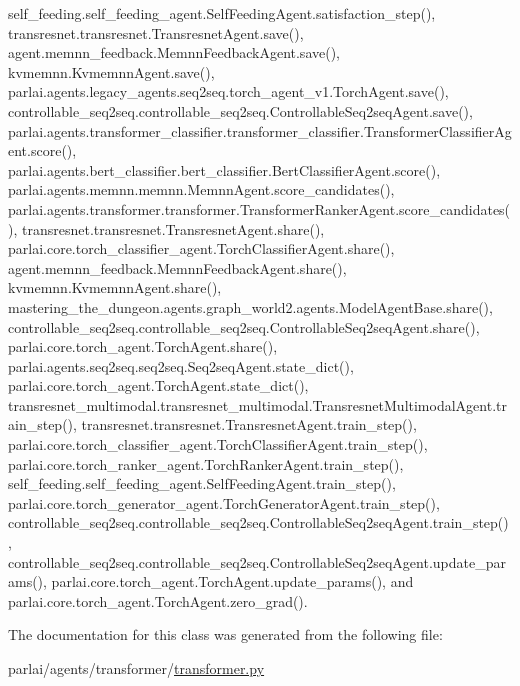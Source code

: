 self\+\_\+feeding.\+self\+\_\+feeding\+\_\+agent.\+Self\+Feeding\+Agent.\+satisfaction\+\_\+step(), transresnet.\+transresnet.\+Transresnet\+Agent.\+save(), agent.\+memnn\+\_\+feedback.\+Memnn\+Feedback\+Agent.\+save(), kvmemnn.\+Kvmemnn\+Agent.\+save(), parlai.\+agents.\+legacy\+\_\+agents.\+seq2seq.\+torch\+\_\+agent\+\_\+v1.\+Torch\+Agent.\+save(), controllable\+\_\+seq2seq.\+controllable\+\_\+seq2seq.\+Controllable\+Seq2seq\+Agent.\+save(), parlai.\+agents.\+transformer\+\_\+classifier.\+transformer\+\_\+classifier.\+Transformer\+Classifier\+Agent.\+score(), parlai.\+agents.\+bert\+\_\+classifier.\+bert\+\_\+classifier.\+Bert\+Classifier\+Agent.\+score(), parlai.\+agents.\+memnn.\+memnn.\+Memnn\+Agent.\+score\+\_\+candidates(), parlai.\+agents.\+transformer.\+transformer.\+Transformer\+Ranker\+Agent.\+score\+\_\+candidates(), transresnet.\+transresnet.\+Transresnet\+Agent.\+share(), parlai.\+core.\+torch\+\_\+classifier\+\_\+agent.\+Torch\+Classifier\+Agent.\+share(), agent.\+memnn\+\_\+feedback.\+Memnn\+Feedback\+Agent.\+share(), kvmemnn.\+Kvmemnn\+Agent.\+share(), mastering\+\_\+the\+\_\+dungeon.\+agents.\+graph\+\_\+world2.\+agents.\+Model\+Agent\+Base.\+share(), controllable\+\_\+seq2seq.\+controllable\+\_\+seq2seq.\+Controllable\+Seq2seq\+Agent.\+share(), parlai.\+core.\+torch\+\_\+agent.\+Torch\+Agent.\+share(), parlai.\+agents.\+seq2seq.\+seq2seq.\+Seq2seq\+Agent.\+state\+\_\+dict(), parlai.\+core.\+torch\+\_\+agent.\+Torch\+Agent.\+state\+\_\+dict(), transresnet\+\_\+multimodal.\+transresnet\+\_\+multimodal.\+Transresnet\+Multimodal\+Agent.\+train\+\_\+step(), transresnet.\+transresnet.\+Transresnet\+Agent.\+train\+\_\+step(), parlai.\+core.\+torch\+\_\+classifier\+\_\+agent.\+Torch\+Classifier\+Agent.\+train\+\_\+step(), parlai.\+core.\+torch\+\_\+ranker\+\_\+agent.\+Torch\+Ranker\+Agent.\+train\+\_\+step(), self\+\_\+feeding.\+self\+\_\+feeding\+\_\+agent.\+Self\+Feeding\+Agent.\+train\+\_\+step(), parlai.\+core.\+torch\+\_\+generator\+\_\+agent.\+Torch\+Generator\+Agent.\+train\+\_\+step(), controllable\+\_\+seq2seq.\+controllable\+\_\+seq2seq.\+Controllable\+Seq2seq\+Agent.\+train\+\_\+step(), controllable\+\_\+seq2seq.\+controllable\+\_\+seq2seq.\+Controllable\+Seq2seq\+Agent.\+update\+\_\+params(), parlai.\+core.\+torch\+\_\+agent.\+Torch\+Agent.\+update\+\_\+params(), and parlai.\+core.\+torch\+\_\+agent.\+Torch\+Agent.\+zero\+\_\+grad().



The documentation for this class was generated from the following file\+:\begin{DoxyCompactItemize}
\item 
parlai/agents/transformer/\hyperlink{transformer_8py}{transformer.\+py}\end{DoxyCompactItemize}
